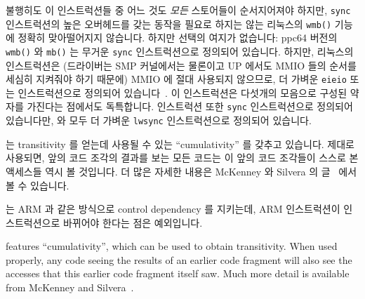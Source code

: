 불행히도 이 인스트럭션들 중 어느 것도 {\em 모든} 스토어들이 순서지어져야
하지만, {\tt sync} 인스트럭션의 높은 오버헤드를 갖는 동작을 필요로 하지는 않는
리눅스의 {\tt wmb()} 기능에 정확히 맞아떨어지지 않습니다.
하지만 선택의 여지가 없습니다: ppc64 버전의 {\tt wmb()} 와 {\tt mb()} 는 무거운
{\tt sync} 인스트럭션으로 정의되어 있습니다.
하지만, 리눅스의  인스트럭션은 (드라이버는 SMP 커널에서는
물론이고 UP 에서도 MMIO 들의 순서를 세심히 지켜줘야 하기 때문에) MMIO 에 절대
사용되지 않으므로, 더 가벼운 {\tt eieio} 또는  인스트럭션으로
정의되어 있습니다~\cite{PaulEMcKenney2016LinuxKernelMMIO}.
이 인스트럭션은 다섯개의 모음으로 구성된 약자를 가진다는 점에서도 독특합니다.
 인스트럭션 또한 {\tt sync} 인스트럭션으로 정의되어 있습니다만,
 와  모두 더 가벼운 {\tt lwsync} 인스트럭션으로
정의되어 있습니다.

\Power{} 는 transitivity 를 얻는데 사용될 수 있는 ``cumulativity'' 를 갖추고
있습니다.
제대로 사용되면, 앞의 코드 조각의 결과를 보는 모든 코드는 이 앞의 코드 조각들이
스스로 본 액세스들 역시 볼 것입니다.
더 많은 자세한 내용은 McKenney 와 Silvera 의 글~\cite{PaulEMcKenneyN2745r2009}
에서 볼 수 있습니다.

\Power{} 는 ARM 과 같은 방식으로 control dependency 를 지키는데, ARM 
인스트럭션이 \Power{}  인스트럭션으로 바뀌어야 한다는 점은
예외입니다.
\iffalse

\Power{} features ``cumulativity'', which can be used to obtain
transitivity.
When used properly, any code seeing the results of an earlier
code fragment will also see the accesses that this earlier code
fragment itself saw.
Much more detail is available from
McKenney and Silvera~\cite{PaulEMcKenneyN2745r2009}.


